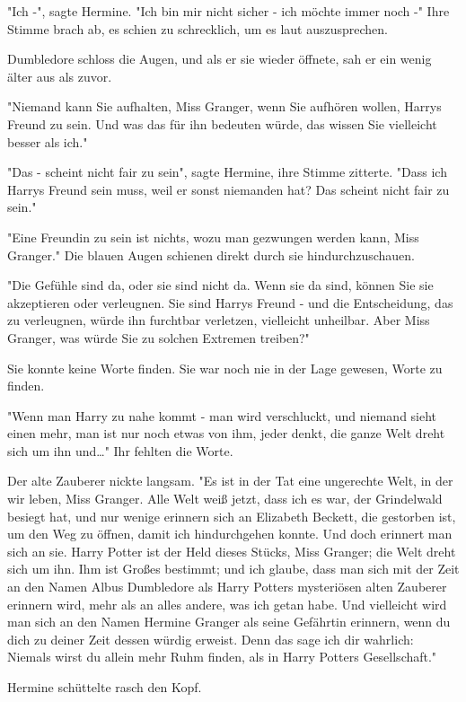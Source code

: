 {"Ich -", sagte Hermine. "Ich bin mir nicht sicher - ich möchte immer noch -" Ihre Stimme brach ab, es schien zu schrecklich, um es laut auszusprechen.

Dumbledore schloss die Augen, und als er sie wieder öffnete, sah er ein wenig älter aus als zuvor.

"Niemand kann Sie aufhalten, Miss Granger, wenn Sie aufhören wollen, Harrys Freund zu sein. Und was das für ihn bedeuten würde, das wissen Sie vielleicht besser als ich."

"Das - scheint nicht fair zu sein", sagte Hermine, ihre Stimme zitterte. "Dass ich Harrys Freund sein muss, weil er sonst niemanden hat? Das scheint nicht fair zu sein."

"Eine Freundin zu sein ist nichts, wozu man gezwungen werden kann, Miss Granger." Die blauen Augen schienen direkt durch sie hindurchzuschauen.

"Die Gefühle sind da, oder sie sind nicht da. Wenn sie da sind, können Sie sie akzeptieren oder verleugnen. Sie sind Harrys Freund - und die Entscheidung, das zu verleugnen, würde ihn furchtbar verletzen, vielleicht unheilbar. Aber Miss Granger, was würde Sie zu solchen Extremen treiben?"

Sie konnte keine Worte finden. Sie war noch nie in der Lage gewesen, Worte zu finden.

"Wenn man Harry zu nahe kommt - man wird verschluckt, und niemand sieht einen mehr, man ist nur noch etwas von ihm, jeder denkt, die ganze Welt dreht sich um ihn und…" Ihr fehlten die Worte.

Der alte Zauberer nickte langsam. "Es ist in der Tat eine ungerechte Welt, in der wir leben, Miss Granger. Alle Welt weiß jetzt, dass ich es war, der Grindelwald besiegt hat, und nur wenige erinnern sich an Elizabeth Beckett, die gestorben ist, um den Weg zu öffnen, damit ich hindurchgehen konnte. Und doch erinnert man sich an sie. Harry Potter ist der Held dieses Stücks, Miss Granger; die Welt dreht sich um ihn. Ihm ist Großes bestimmt; und ich glaube, dass man sich mit der Zeit an den Namen Albus Dumbledore als Harry Potters mysteriösen alten Zauberer erinnern wird, mehr als an alles andere, was ich getan habe. Und vielleicht wird man sich an den Namen Hermine Granger als seine Gefährtin erinnern, wenn du dich zu deiner Zeit dessen würdig erweist. Denn das sage ich dir wahrlich: Niemals wirst du allein mehr Ruhm finden, als in Harry Potters Gesellschaft."

Hermine schüttelte rasch den Kopf.

}

